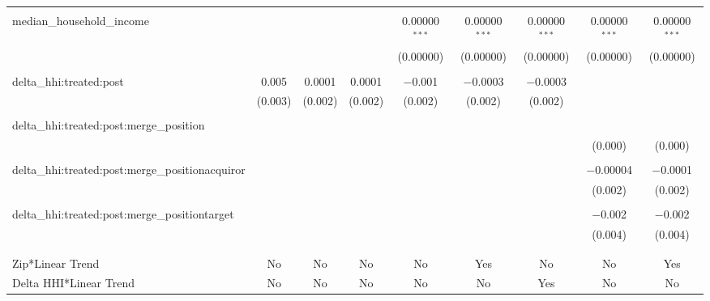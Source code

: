 \begin{table}[H]
{\begin{tabular}{@{\extracolsep{5pt}}lcccccccc}
   & & & & & & & & \\  

  median\_household\_income &  &  &  & 0.00000$^{***}$ & 0.00000$^{***}$ & 0.00000$^{***}$ & 0.00000$^{***}$ & 0.00000$^{***}$ \\  

   &  &  &  & (0.00000) & (0.00000) & (0.00000) & (0.00000) & (0.00000) \\  

   & & & & & & & & \\  

  delta\_hhi:treated:post & 0.005 & 0.0001 & 0.0001 & $-$0.001 & $-$0.0003 & $-$0.0003 &  &  \\  

   & (0.003) & (0.002) & (0.002) & (0.002) & (0.002) & (0.002) &  &  \\  

   & & & & & & & & \\  

  delta\_hhi:treated:post:merge\_position &  &  &  &  &  &  &  &  \\  

   &  &  &  &  &  &  & (0.000) & (0.000) \\  

   & & & & & & & & \\  

  delta\_hhi:treated:post:merge\_positionacquiror &  &  &  &  &  &  & $-$0.00004 & $-$0.0001 \\  

   &  &  &  &  &  &  & (0.002) & (0.002) \\  

   & & & & & & & & \\  

  delta\_hhi:treated:post:merge\_positiontarget &  &  &  &  &  &  & $-$0.002 & $-$0.002 \\  

   &  &  &  &  &  &  & (0.004) & (0.004) \\  

   & & & & & & & & \\  

 \hline \\[-1.8ex]  

 Zip*Linear Trend & No & No & No & No & Yes & No & No & Yes \\  

 Delta HHI*Linear Trend & No & No & No & No & No & Yes & No & No \\  


\end{tabular}}
\end{table}
